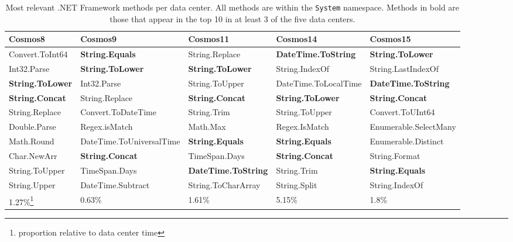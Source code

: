 \begin{table}[ht]
\small
 \begin{tabular}{@{}llllp{3.5cm}@{}}

  Cosmos8 & Cosmos9 & Cosmos11 & Cosmos14 & Cosmos15 \\
 \midrule
Convert.ToInt64 & \textbf{String.Equals} & String.Replace & \textbf{DateTime.ToString} & \textbf{String.ToLower} \\
Int32.Parse & \textbf{String.ToLower} & \textbf{String.ToLower} & String.IndexOf & String.LastIndexOf \\
\textbf{String.ToLower} & Int32.Parse & String.ToUpper & DateTime.ToLocalTime & \textbf{DateTime.ToString}\\
\textbf{String.Concat} & String.Replace & \textbf{String.Concat} & \textbf{String.ToLower} & \textbf{String.Concat}\\
String.Replace & Convert.ToDateTime & String.Trim & String.ToUpper & Convert.ToUInt64 \\
Double.Parse & Regex.isMatch & Math.Max & Regex.IsMatch & Enumerable.SelectMany \\
Math.Round& DateTime.ToUniversalTime & \textbf{String.Equals} & \textbf{String.Equals} & Enumerable.Distinct \\
Char.NewArr & \textbf{String.Concat} & TimeSpan.Days & \textbf{String.Concat} & String.Format \\
String.ToUpper & TimeSpan.Days & \textbf{DateTime.ToString} & String.Trim & \textbf{String.Equals}\\
String.Upper & DateTime.Subtract & String.ToCharArray & String.Split & String.IndexOf \\

\midrule
1.27\%\footnote{proportion relative to data center time} & 0.63\% & 1.61\% & 5.15\% & 1.8\%\\
\midrule

\end{tabular}
 
\caption{Most relevant .NET Framework methods per data center. All methods are within the {\tt System} namespace. Methods in bold are those that appear in the top 10 in at least 3 of the five data centers.
\label{tb:rankedMethods}}
\end{table}


